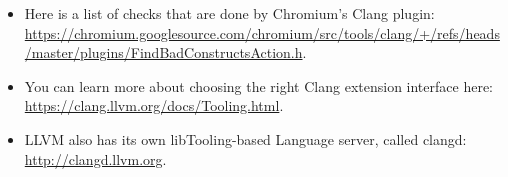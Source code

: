 
\begin{itemize}
\item Here is a list of checks that are done by Chromium's Clang plugin: \url{https://chromium.googlesource.com/chromium/src/tools/clang/+/refs/heads/master/plugins/FindBadConstructsAction.h}.

\item You can learn more about choosing the right Clang extension interface here: \url{https://clang.llvm.org/docs/Tooling.html}.

\item LLVM also has its own libTooling-based Language server, called clangd: \url{http://clangd.llvm.org}.
\end{itemize}
